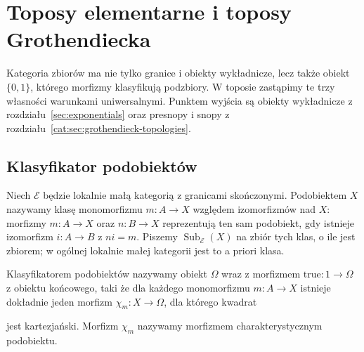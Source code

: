\section{Toposy elementarne i toposy Grothendiecka}\label{cat:sec:toposes}

Kategoria zbiorów ma nie tylko granice i obiekty wykładnicze, lecz także obiekt $\{0,1\}$, którego morfizmy klasyfikują podzbiory. W toposie zastąpimy te trzy własności warunkami uniwersalnymi. Punktem wyjścia są obiekty wykładnicze z rozdziału~\ref{sec:exponentials} oraz presnopy i snopy z rozdziału~\ref{cat:sec:grothendieck-topologies}.

\subsection{Klasyfikator podobiektów}

Niech $\mathcal E$ będzie lokalnie małą kategorią z granicami skończonymi. Podobiektem $X$ nazywamy klasę monomorfizmu $m:A\to X$ względem izomorfizmów nad $X$: morfizmy $m:A\to X$ oraz $n:B\to X$ reprezentują ten sam podobiekt, gdy istnieje izomorfizm $i:A\to B$ z $ni=m$. Piszemy $\operatorname{Sub}_{\mathcal E}(X)$ na zbiór tych klas, o ile jest zbiorem; w ogólnej lokalnie małej kategorii jest to a priori klasa.

\begin{definicja}\label{cat:def:subobject-classifier}
Klasyfikatorem podobiektów nazywamy obiekt $\Omega$ wraz z morfizmem $\mathrm{true}:1\to\Omega$ z obiektu końcowego, taki że dla każdego monomorfizmu $m:A\to X$ istnieje dokładnie jeden morfizm $\chi_m:X\to\Omega$, dla którego kwadrat
\begin{center}
\end{center}
jest kartezjański. Morfizm $\chi_m$ nazywamy morfizmem charakterystycznym podobiektu.
\end{definicja}

